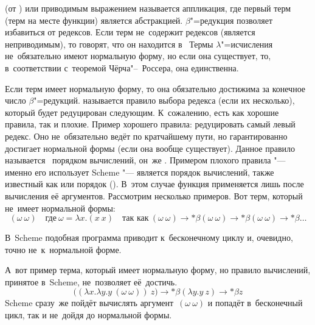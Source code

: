  (от ) или приводимым выражением
называется аппликация, где первый терм (терм на месте функции) является
абстракцией. $\beta$"=редукция позволяет избавиться от редексов. Если терм
не~содержит редексов (является неприводимым), то говорят, что он находится
в~ Термы $\lambda$"=исчисления не~обязательно имеют
нормальную форму, но если она существует, то, в~соответствии с~теоремой
Чёрча"--~Россера, она единственна.

Если терм имеет нормальную форму, то она обязательно достижима за конечное
число $\beta$"=редукций.  называется правило выбора
редекса (если их несколько), который будет редуцирован следующим. К~сожалению,
есть как хорошие правила, так и плохие. Пример хорошего правила: редуцировать
самый левый редекс. Оно не~обязательно ведёт по кратчайшему пути, но
гарантированно достигает нормальной формы (если она вообще существует). Данное
правило называется~ порядком вычислений, он~же . Примером плохого правила "--- именно его использует Scheme "--- является
 порядок вычислений, также известный как  или  порядок (). В~этом
случае функция применяется лишь после вычисления её аргументов. Рассмотрим
несколько примеров. Вот терм, который не~имеет нормальной формы:
%
\[
  (\omega\ \omega) \quad \text{где}\ \omega = \lambda x . (x\ x)
      \quad \text{так как}\ (\omega\ \omega) \to*{\beta} (\omega\ \omega)
                                             \to*{\beta} (\omega\ \omega)
                                             \to*{\beta} \dots
\]

В~Scheme подобная программа приводит к~бесконечному циклу и, очевидно, точно
не~к~нормальной форме.

А~вот пример терма, который имеет нормальную форму, но правило вычислений,
принятое в~Scheme, не~позволяет её~достичь.
%
\[
  \big((\lambda x . \lambda y . y\ (\omega\ \omega))\ z\big)
      \to*{\beta} (\lambda y . y\ z) \to*{\beta} z
\]
%
Scheme сразу~же пойдёт вычислять аргумент~$(\omega\ \omega)$ и попадёт
в~бесконечный цикл, так и не~дойдя до нормальной формы.

